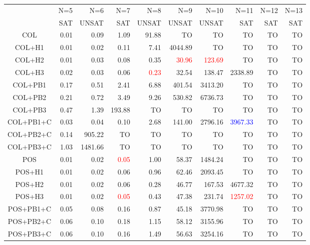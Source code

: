 
\begin{tabular}[c]{|c|r|r|r|r|r|r|r|r|r|}\hline
               & N=5  & N=6     & N=7          & N=8          &    N=9                &   N=10                   &    N=11& N=12& N=13 \\
               & SAT  & UNSAT   & SAT          & UNSAT        &  UNSAT        &  UNSAT         &    SAT & SAT & SAT \\\hline
    COL        & 0.01 & 0.09    & 1.09         & 91.88        & TO            &      TO        &      TO&   TO& TO \\
    COL+H1     & 0.01 & 0.02    & 0.11         & 7.41         & 4044.89       &      TO        &      TO&   TO& TO \\
    COL+H2     & 0.01 & 0.03    & 0.08         & 0.35         & \textcolor{red}{30.96} &  \textcolor{red}{123.69}&      TO&   TO& TO \\
    COL+H3     & 0.02 & 0.03    & 0.06         & \textcolor{red}{0.23} & 32.54         &  138.47        & 2338.89&   TO& TO \\
    COL+PB1    & 0.17 & 0.51    & 2.41         & 6.88         & 401.54        & 3413.20        &      TO&   TO& TO \\
    COL+PB2    & 0.21 & 0.72    & 3.49         & 9.26         & 530.82        & 6736.73        &      TO&   TO& TO \\
    COL+PB3    & 0.47 & 1.39    & 193.88       & TO           & TO            & TO             &      TO&   TO& TO \\
    COL+PB1+C  & 0.03 & 0.04    & 0.10         & 2.68         & 141.00        & 2796.16        & \textcolor{blue}{3967.33} & TO & TO \\
    COL+PB2+C  & 0.14 & 905.22  & TO           & TO           & TO            & TO             & TO  & TO & TO \\
    COL+PB3+C  & 1.03 & 1481.66 & TO           & TO           & TO            & TO             & TO  & TO & TO \\
    POS        & 0.01 & 0.02    & \textcolor{red}{0.05} & 1.00         & 58.37 & 1484.24&              TO&   TO& TO \\
    POS+H1     & 0.01 & 0.02    & 0.06         & 0.96         & 62.46 & 2093.45&              TO&   TO& TO \\
    POS+H2     & 0.01 & 0.02    & 0.06         & 0.28         & 46.77 &  167.53&         4677.32&   TO& TO \\
    POS+H3     & 0.01 & 0.02    & \textcolor{red}{0.05} & 0.43         & 47.38 &  231.74& \textcolor{red}{1257.02}&   TO& TO \\ 
    POS+PB1+C  & 0.05 & 0.08    & 0.16         & 0.87         & 45.18 & 3770.98&             TO &  TO & TO \\
    POS+PB2+C  & 0.06 & 0.10    & 0.18         & 1.15         & 58.12 & 3155.96&             TO &  TO & TO \\
    POS+PB3+C  & 0.06 & 0.10    & 0.16                   & 1.49         & 56.63   & 3254.16                  &  TO & TO & TO\\\hline
\end{tabular}
